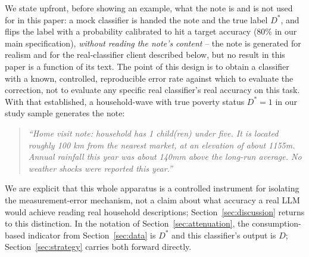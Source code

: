 \documentclass[12pt]{article}
\begin{document}
We state upfront, before showing an example, what the note is and is not used for in this paper: a mock classifier is handed the note and the true label $D^{*}$, and flips the label with a probability calibrated to hit a target accuracy (80\% in our main specification), \emph{without reading the note's content} -- the note is generated for realism and for the real-classifier client described below, but no result in this paper is a function of its text. The point of this design is to obtain a classifier with a known, controlled, reproducible error rate against which to evaluate the correction, not to evaluate any specific real classifier's real accuracy on this task. With that established, a household-wave with true poverty status $D^{*}=1$ in our study sample generates the note:

\begin{quote}
\itshape ``Home visit note: household has 1 child(ren) under five. It is located roughly 100 km from the nearest market, at an elevation of about 1155m. Annual rainfall this year was about 140mm above the long-run average. No weather shocks were reported this year.''
\end{quote}

We are explicit that this whole apparatus is a controlled instrument for isolating the measurement-error mechanism, not a claim about what accuracy a real LLM would achieve reading real household descriptions; Section~\ref{sec:discussion} returns to this distinction. In the notation of Section~\ref{sec:attenuation}, the consumption-based indicator from Section~\ref{sec:data} is $D^{*}$ and this classifier's output is $D$; Section~\ref{sec:strategy} carries both forward directly.
\end{document}
